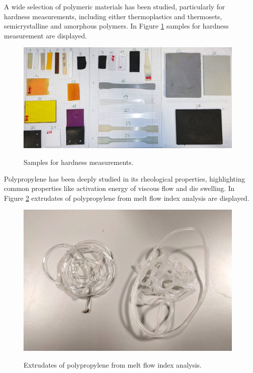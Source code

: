 \documentclass[a4paper, 11pt]{article}
\begin{document}
A wide selection of polymeric materials has been studied, particularly for hardness measurements, including either thermoplastics and thermosets, semicrystalline and amorphous polymers. In Figure \ref{fig:rubber} samples for hardness measurement are displayed. 
\begin{figure}[h!]
	\centering
	{\includegraphics[scale=0.3]{rubber}}
	\captionsetup{justification=centering}
	\caption{Samples for hardness measurements.}
	\label{fig:rubber}
\end{figure}
\newpage
Polypropylene has been deeply studied in its rheological properties, highlighting common properties like activation energy of viscous flow and die swelling. In Figure \ref{fig:melt} extrudates of polypropylene from melt flow index analysis are displayed. 
\begin{figure}[h!]
	\centering
	{\includegraphics[scale=0.2]{melt}}
	\captionsetup{justification=centering}
	\caption{Extrudates of polypropylene from melt flow index analysis.}
	\label{fig:melt}
\end{figure}\\
\end{document}
